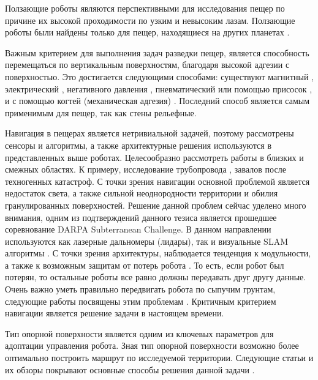 Ползающие роботы \cite{Schmidt2013} являются перспективными для исследования пещер по причине их высокой проходимости по узким и невысоким лазам. Ползающие роботы были найдены только для пещер, находящиеся на других планетах \cite{Parness2017}. 

Важным критерием для выполнения задач разведки пещер, является способность перемещаться по вертикальным поверхностям, благодаря высокой адгезии с поверхностью. Это достигается следующими способами: существуют магнитный \cite{Lee2012,tavakoliOmniClimberOmnidirectionalLight2012,Kotay1996,Xu2017}, электрический \cite{Li2017}, негативного давления \cite{Lee2012,tavakoliOmniClimberOmnidirectionalLight2012,Papachristos2019}, пневматический или помощью присосок \cite{Nagakubo1994,Tlale2012}, и с помощью когтей (механическая адгезия) \cite{Parness2017,Bretl2006,SangbaeKim2005,Sintov2011}. Последний способ является самым применимым для пещер, так как стены рельефные.

Навигация в пещерах является нетривиальной задачей, поэтому рассмотрены сенсоры и алгоритмы, а также архитектурные решения используются в представленных выше роботах. Целесообразно рассмотреть работы в близких и смежных областях. К примеру, исследование трубопровода \cite{Savin2017}, завалов после техногенных катастроф. С точки зрения навигации основной проблемой является недостаток света, а также сильной неоднородности территории и обилия гранулированных поверхностей. Решение данной проблем сейчас уделено много внимания, одним из подтверждений данного тезиса является прошедшее соревнование DARPA Subterranean Challenge. В данном направлении используются как лазерные дальномеры (лидары), так и визуальные SLAM алгоритмы \cite{Mascarich2018a,Dang2019a,Fairfield2006,Chhaniyara2012}. С точки зрения архитектуры, наблюдается тенденция к модульности, а также к возможным защитам от потерь робота \cite{Miller2019,weiStudyMineRescue2009}. То есть, если робот был потерян, то остальные роботы все равно должны передавать друг другу данные. Очень важно уметь правильно передвигать робота по сыпучим грунтам, следующие работы посвящены этим проблемам \cite{Tan2016,Savin2017,Chhaniyara2012,Tsounis2019, Li2009,Bjelonic2019,DeViragh2019,Buchanan2019}. Критичным критерием навигации является решение задачи в настоящем времени.

Тип опорной поверхности является одним из ключевых параметров для адоптации управления робота. Зная тип опорной поверхности возможно более оптимально построить маршрут по исследуемой территории. Следующие статьи и их обзоры покрывают основные способы решения данной задачи \cite{wuIntegratedGroundReaction2016,wuTactileSensingTerrainBased2020,luo_robotic_2017}.

